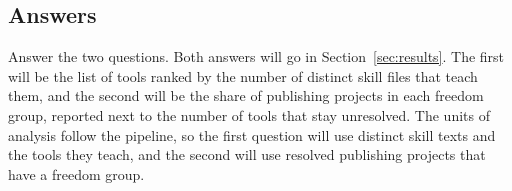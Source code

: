 \subsection{Answers}

Answer the two questions.
Both answers will go in Section~\ref{sec:results}.
The first will be the list of tools ranked by the number of distinct skill files that teach them, and the second will be the share of publishing projects in each freedom group, reported next to the number of tools that stay unresolved.
The units of analysis follow the pipeline, so the first question will use distinct skill texts and the tools they teach, and the second will use resolved publishing projects that have a freedom group.
